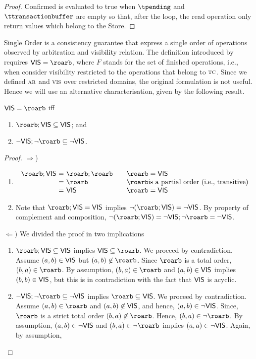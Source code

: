 \begin{proof} Confirmed is evaluated to true when $\tpending$ and $\ttransactionbuffer$ are empty so that, after the loop, the read operation only return values which belong to the Store.
\end{proof}	


Single Order is a consistency guarantee that express a single order of operations observed by arbitration and visibility relation. The definition introduced by \cite{} requires 
$\ovis = \roarb$, where $F$ stands for the set of finished operations, i.e., when consider visibility restricted to the operations that belong to $\textsc{\scriptsize{TC}}$. 
Since we defined $\textsc{\scriptsize{AR}}$ and $\textsc{\scriptsize{VIS}}$ over restricted domains, the original formulation is not useful. Hence we will use an alternative characterisation, given by the 
following result.

\begin{lemma} $\ovis = \roarb$ iff 
\begin{enumerate}
   \item $\roarb;\ovis \subseteq \ovis$; and
   \item $\neg\ovis;\neg\roarb \subseteq \neg\ovis$.
\end{enumerate}
\end{lemma}

\begin{proof} $\Rightarrow$) 
\begin{enumerate}
\item
	\[ \begin{array}{l@{\ =\ }l@{\qquad}l}
		\roarb;\ovis &  \roarb;\roarb & \roarb =\ovis\\
		& \roarb & \roarb \mbox{is a partial order (i.e., transitive)}\\
		&  \ovis & \roarb =\ovis
   	\end{array}
	\]
\item Note that  $\roarb;\ovis =\ovis$ implies $\neg(\roarb;\ovis) =\neg\ovis$. By property of complement and composition, $\neg(\roarb;\ovis) =\neg\ovis;\neg\roarb =\neg\ovis$. 
\end{enumerate}

$\Leftarrow)$ We divided the proof in two implications
 \begin{enumerate}
    \item  $\roarb;\ovis \subseteq \ovis$ implies $\ovis\subseteq \roarb$. We proceed by contradiction. Assume $(a,b)\in\mathsf{\scriptsize{VIS}}$ but $(a,b)\not\in\roarb$.
    Since $\roarb$ is a total order, $(b,a)\in\roarb$. By assumption, $(b,a)\in\roarb$ and $(a,b)\in\mathsf{\scriptsize{VIS}}$ implies $(b,b)\in\mathsf{\scriptsize{VIS}}$, but this is in contradiction 
    with the fact that $\mathsf{\scriptsize{VIS}}$ is acyclic. 
        
    \item $\neg\ovis;\neg\roarb \subseteq \neg\ovis$ implies $\roarb\subseteq\ovis$. We proceed by contradiction. 
    Assume $(a,b)\in\roarb$ and $(a,b)\not\in\mathsf{\scriptsize{VIS}}$, and hence,  $(a,b)\in\neg\mathsf{\scriptsize{VIS}}$. Since,
    $\roarb$ is a strict total order $(b,a)\not\in\roarb$. Hence, $(b,a)\in\neg\roarb$. By assumption, $(a,b)\in\neg\mathsf{\scriptsize{VIS}}$ and $(b,a)\in\neg\roarb$ implies $(a,a)\in\neg\mathsf{\scriptsize{VIS}}$.
    Again, by assumption, 
 \end{enumerate}

\end{proof}

